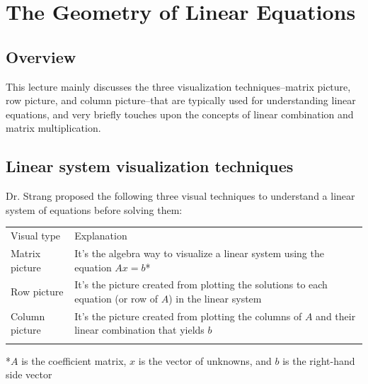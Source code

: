 \documentclass[../main.tex]{subfiles}
\begin{document}
\section{The Geometry of Linear Equations}


\subsection{Overview}
This lecture mainly discusses the three visualization techniques--matrix picture, row picture, and column picture--that are typically used for understanding linear equations, and very briefly touches upon the concepts of linear combination and matrix multiplication.


\subsection{Linear system visualization techniques}
Dr. Strang proposed the following three visual techniques to understand a linear system of equations before solving them:

\begin{tabular}{@{}ll@{}}
    \trule
    \textrm{Visual type} & \textrm{Explanation}                                              \\
    \mrule
    Matrix picture       & \makecell{It's the algebra way to visualize a linear system using \\ the equation \(Ax = b\)*} \\
    Row picture          & \makecell{It's the picture created from plotting the solutions to \\ each equation (or row of \(A\)) in the linear system} \\
    Column picture       & \makecell{It's the picture created from plotting the columns of   \\ \(A\) and their linear combination that yields \(b\)} \\
    \brule
\end{tabular}
*\(A\) is the coefficient matrix, \(x\) is the vector of unknowns, and \(b\) is the right-hand side vector
\vspace{0.5em}
\end{document}

